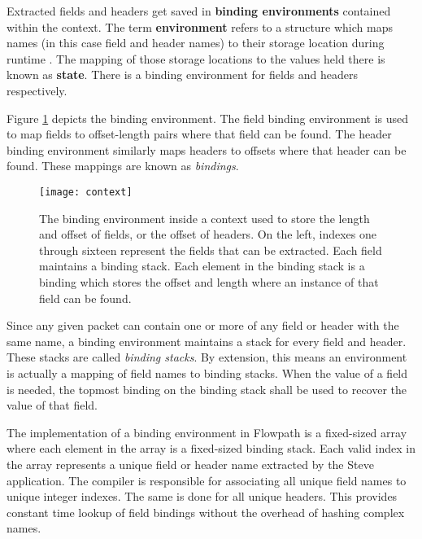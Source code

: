 Extracted fields and headers get saved in \textbf{binding environments} contained within the context. The term \textbf{environment} refers to a structure which maps names (in this case field and header names) to their storage location during runtime \cite{compilers1}. The mapping of those storage locations to the values held there is known as \textbf{state}. There is a binding environment for fields and headers respectively.

Figure \ref{fg:ContextEnv} depicts the binding environment. The field binding environment is used to map fields to offset-length pairs where that field can be found. The header binding environment similarly maps headers to offsets where that header can be found. These mappings are known as \textit{bindings}.

\begin{figure}
\texttt{[image: context]}
\caption{The binding environment inside a context used to store the length and offset of fields, or the offset of headers. On the left, indexes one through sixteen represent the fields that can be extracted. Each field maintains a binding stack. Each element in the binding stack is a binding which stores the offset and length where an instance of that field can be found. }
\label{fg:ContextEnv}
\end{figure}

Since any given packet can contain one or more of any field or header with the same name, a binding environment maintains a stack for every field and header. These stacks are called \textit{binding stacks}. By extension, this means an environment is actually a mapping of field names to binding stacks. When the value of a field is needed, the topmost binding on the binding stack shall be used to recover the value of that field.

The implementation of a binding environment in Flowpath is a fixed-sized array where each element in the array is a fixed-sized binding stack. Each valid index in the array represents a unique field or header name extracted by the Steve application. The compiler is responsible for associating all unique field names to unique integer indexes. The same is done for all unique headers. This provides constant time lookup of field bindings without the overhead of hashing complex names.


